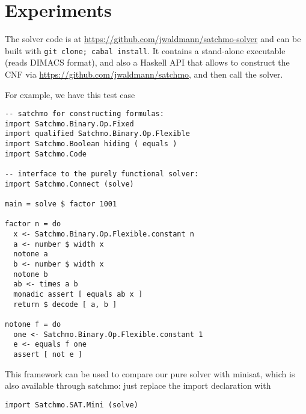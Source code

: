 \section{Experiments}

The solver code is at \url{https://github.com/jwaldmann/satchmo-solver}
and can be built with \verb|git clone; cabal install|.
It contains a stand-alone executable (reads DIMACS format),
and also a Haskell API that allows to construct the CNF via
\url{https://github.com/jwaldmann/satchmo}, and then call the solver.

For example, we have this test case
\begin{verbatim}
-- satchmo for constructing formulas:
import Satchmo.Binary.Op.Fixed
import qualified Satchmo.Binary.Op.Flexible
import Satchmo.Boolean hiding ( equals )
import Satchmo.Code

-- interface to the purely functional solver:
import Satchmo.Connect (solve)

main = solve $ factor 1001

factor n = do
  x <- Satchmo.Binary.Op.Flexible.constant n
  a <- number $ width x
  notone a
  b <- number $ width x
  notone b
  ab <- times a b
  monadic assert [ equals ab x ]
  return $ decode [ a, b ]

notone f = do
  one <- Satchmo.Binary.Op.Flexible.constant 1
  e <- equals f one
  assert [ not e ]
\end{verbatim}
This framework can be used to compare our pure solver with minisat,
which is also available through satchmo:
just replace the import declaration with 
\begin{verbatim}
import Satchmo.SAT.Mini (solve)
\end{verbatim}

